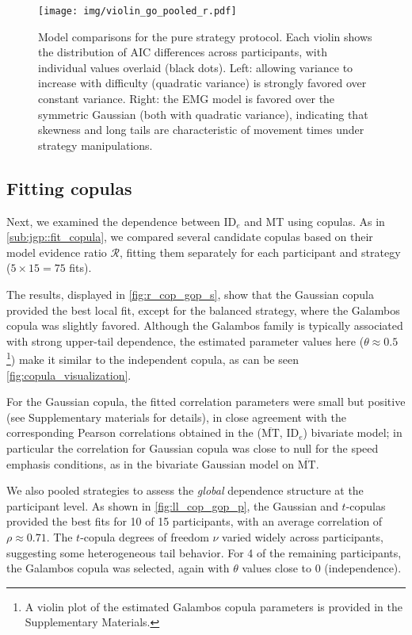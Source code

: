 \documentclass[acmlarge, manuscript,review]{acmart}
\newcommand{\mmt}{\ensuremath{\overline{\mt}}\xspace}
\newcommand{\mt}{\ensuremath{{\text{MT}}}\xspace}
\newcommand{\ide}{\ensuremath{{\text{ID}_e}}\xspace}
\begin{document}
\begin{figure}[htbp]
	\centering
	\texttt{[image: img/violin\_go\_pooled\_r.pdf]}
	\caption{Model comparisons for the pure strategy protocol. Each violin shows the distribution of AIC differences across participants, with individual values overlaid (black dots). Left: allowing variance to increase with difficulty (quadratic variance) is strongly favored over constant variance. Right: the EMG model is favored over the symmetric Gaussian (both with quadratic variance), indicating that skewness and long tails are characteristic of movement times under strategy manipulations.}
	\label{fig:violin_go}
\end{figure}

\subsection{Fitting copulas \label{sub:go:fit_cop}}


Next, we examined the dependence between \ide and MT using copulas. As in \autoref{sub:jgp::fit_copula}, we compared several candidate copulas based on their model evidence ratio $\mathcal{R}$, fitting them separately for each participant and strategy ($5\times 15=75$ fits).

The results, displayed in \autoref{fig:r_cop_gop_s}, show that the Gaussian copula provided the best local fit, except for the balanced strategy, where the Galambos copula was slightly favored. Although the Galambos family is typically associated with strong upper-tail dependence, the estimated parameter values here ($\theta \approx 0.5$\footnote{A violin plot of the estimated Galambos copula parameters is provided in the Supplementary Materials.}) make it similar to the independent copula, as can be seen \autoref{fig:copula_visualization}. 

For the Gaussian copula, the fitted correlation parameters were small but positive (see Supplementary materials for details), in close agreement with the corresponding Pearson correlations obtained in the (\mmt, \ide) bivariate model; in particular the correlation for Gaussian copula was close to null for the speed emphasis conditions, as in the bivariate Gaussian model on \mmt.

We also pooled strategies to assess the \textit{global} dependence structure at the participant level. As shown in \autoref{fig:ll_cop_gop_p}, the Gaussian and $t$-copulas provided the best fits for 10 of 15 participants, with an average correlation of $\rho \approx 0.71$. The $t$-copula degrees of freedom $\nu$ varied widely across participants, suggesting some heterogeneous tail behavior. For 4 of the remaining participants, the Galambos copula was selected, again with $\theta$ values close to 0 (independence).
\end{document}
